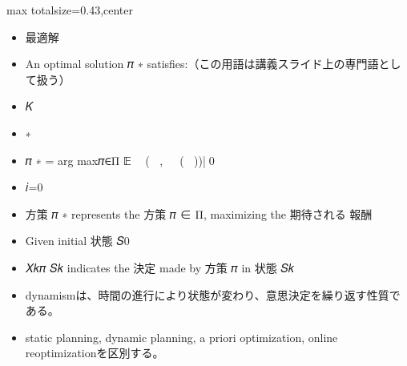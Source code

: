 \clearpage
{}
\begin{minipage}[t]{0.405\textwidth}
\begin{adjustbox}{max totalsize={\textwidth}{0.43\textheight},center}
\begin{minipage}{\textwidth}\scriptsize
{}\begin{itemize}
\item 最適解
\item An optimal solution 𝜋 ∗ satisfies:（この用語は講義スライド上の専門語として扱う）
\item 𝐾
\item ∗
\item 𝜋 ∗ = arg max𝜋∈Π 𝔼 ෍ 𝑅(𝑆𝑖 , 𝑋𝑖𝜋 (𝑆𝑖 ))|𝑆0
\item 𝑖=0
\item 方策 𝜋 ∗ represents the 方策 𝜋 ∈ Π, maximizing the 期待される 報酬
\item Given initial 状態 𝑆0
\item 𝑋𝑘𝜋 𝑆𝑘 indicates the 決定 made by 方策 𝜋 in 状態 𝑆𝑘
\end{itemize}\begin{itemize}
\item dynamismは、時間の進行により状態が変わり、意思決定を繰り返す性質である。
\item static planning, dynamic planning, a priori optimization, online reoptimizationを区別する。
\end{itemize}
\end{minipage}
\end{adjustbox}
\end{minipage}\hfill
